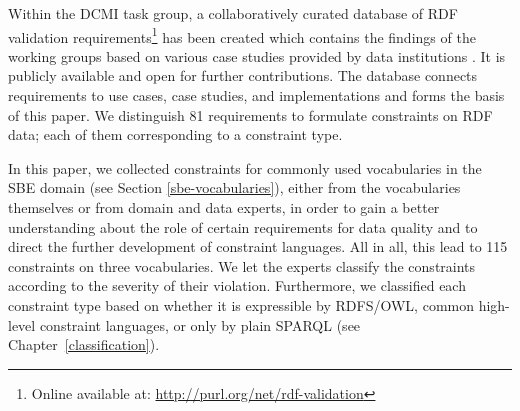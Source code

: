 \documentclass[conference]{IEEEtran}
\begin{document}
Within the DCMI task group, a collaboratively curated database of RDF validation requirements\footnote{Online available at: \url{http://purl.org/net/rdf-validation}} has been created which contains the findings of the working groups based on various case studies provided by data institutions \cite{BoschEckert2014}. It is publicly available and open for further contributions.
The database connects requirements to use cases, case studies, and implementations and forms the basis of this paper. 
We distinguish 81 requirements to formulate constraints on RDF data; 
each of them corresponding to a constraint type.

In this paper, we collected constraints for commonly used vocabularies in the SBE domain (see Section \ref{sbe-vocabularies}), either from the vocabularies themselves or from domain and data experts, in order to gain a better understanding about the role of certain requirements for data quality and to direct the further development of constraint languages. All in all, this lead to 115 constraints on three vocabularies.
We let the experts classify the constraints according to the severity of their violation. Furthermore, we classified each constraint type based on whether it is expressible by RDFS/OWL, common high-level constraint languages, or only by plain SPARQL (see Chapter~\ref{classification}).
\end{document}
